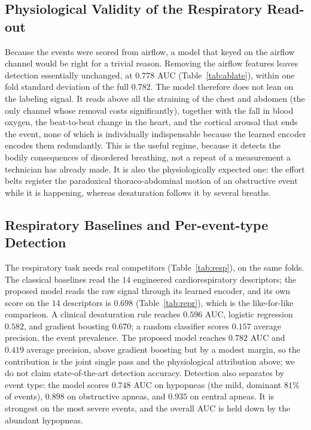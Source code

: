 \documentclass{ieeeaccess}
\newcommand{\mmAuc}{0.782}   %
\newcommand{\mmAp}{0.419}    %
\newcommand{\noflowAuc}{0.778}
\begin{document}
\subsection{Physiological Validity of the Respiratory Read-out}
\label{sec:noflow}
Because the events were scored from airflow, a model that keyed on the airflow channel would
be right for a trivial reason. Removing the airflow features leaves detection essentially
unchanged, at $\noflowAuc$ AUC (Table~\ref{tab:ablate}), within one fold standard deviation of
the full $\mmAuc$. The model therefore does not lean on the labeling signal. It reads above all
the straining of the chest and abdomen (the only channel whose removal costs significantly),
together with the fall in blood oxygen, the beat-to-beat change in the heart, and the
cortical arousal that ends the event, none of which is individually indispensable because the
learned encoder encodes them redundantly. This is the useful regime, because it detects the
bodily consequences of disordered breathing, not a repeat of a measurement a technician
has already made. It is also the physiologically expected one: the effort belts register the
paradoxical thoraco-abdominal motion of an obstructive event while it is happening, whereas
desaturation follows it by several breaths.

\subsection{Respiratory Baselines and Per-event-type Detection}
The respiratory task needs real competitors (Table~\ref{tab:resp}), on the same folds.
The classical baselines read the $14$ engineered cardiorespiratory descriptors; the proposed
model reads the raw signal through its learned encoder, and its own score on the $14$
descriptors is $0.698$ (Table~\ref{tab:repr}), which is the like-for-like comparison. A clinical desaturation rule reaches $0.596$ AUC, logistic
regression $0.582$, and gradient boosting $0.670$; a random classifier scores $0.157$ average
precision, the event prevalence. The proposed model reaches $\mmAuc$ AUC and $\mmAp$ average
precision, above gradient boosting but by a modest margin, so the contribution is the joint
single pass and the physiological attribution above; we do not claim state-of-the-art
detection accuracy. Detection also separates by event type: the model scores $0.748$ AUC on hypopneas (the
mild, dominant $81\%$ of events), $0.898$ on obstructive apneas, and $0.935$ on central apneas.
It is strongest on the most severe events, and the overall AUC is held down by the abundant
hypopneas.
\end{document}
